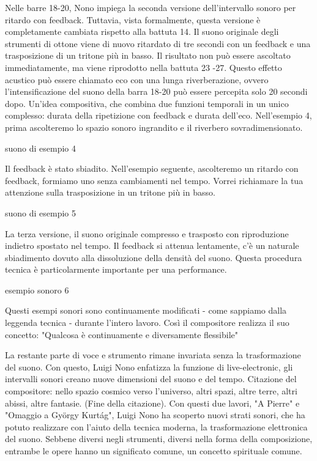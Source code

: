 Nelle barre 18-20, Nono impiega la seconda versione dell'intervallo sonoro per ritardo con feedback. Tuttavia, vista formalmente, questa versione è completamente cambiata rispetto alla battuta 14. Il suono originale degli strumenti di ottone viene di nuovo ritardato di tre secondi con un feedback e una trasposizione di un tritone più in basso. Il risultato non può essere ascoltato immediatamente, ma viene riprodotto nella battuta 23 -27. Questo effetto acustico può essere chiamato eco con una lunga riverberazione, ovvero l'intensificazione del suono della barra 18-20 può essere percepita solo 20 secondi dopo. Un'idea compositiva, che combina due funzioni temporali in un unico complesso: durata della ripetizione con feedback e durata dell'eco. Nell'esempio 4, prima ascolteremo lo spazio sonoro ingrandito e il riverbero sovradimensionato. 

suono di esempio 4 

Il feedback è stato sbiadito. Nell'esempio seguente, ascolteremo un ritardo con feedback, formiamo uno senza cambiamenti nel tempo. Vorrei richiamare la tua attenzione sulla trasposizione in un tritone più in basso. 

suono di esempio 5 

La terza versione, il suono originale compresso e trasposto con riproduzione indietro spostato nel tempo. Il feedback si attenua lentamente, c'è un naturale sbiadimento dovuto alla dissoluzione della densità del suono. Questa procedura tecnica è particolarmente importante per una performance. 

esempio sonoro 6 

Questi esempi sonori sono continuamente modificati - come sappiamo dalla leggenda tecnica - durante l'intero lavoro. Così il compositore realizza il suo concetto: "Qualcosa è continuamente e diversamente flessibile" 

La restante parte di voce e strumento rimane invariata senza la trasformazione del suono. Con questo, Luigi Nono enfatizza la funzione di live-electronic, gli intervalli sonori creano nuove dimensioni del suono e del tempo. Citazione del compositore: nello spazio cosmico verso l'universo, altri spazi, altre terre, altri abissi, altre fantasie. (Fine della citazione). 
Con questi due lavori, "A Pierre" e "Omaggio a György Kurtág", Luigi Nono ha scoperto nuovi strati sonori, che ha potuto realizzare con l'aiuto della tecnica moderna, la trasformazione elettronica del suono. Sebbene diversi negli strumenti, diversi nella forma della composizione, entrambe le opere hanno un significato comune, un concetto spirituale comune. 

